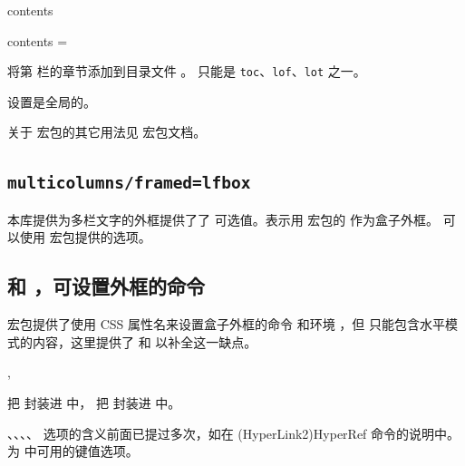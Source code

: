 \documentclass[twoside]{book}
\newcommand{\pkgdoc}[1]{\pkg{#1} 宏包文档}
\begin{document}
\begin{keyval}[path=paracol]{contents}
  \begin{syntax}
    contents =  
  \end{syntax}
  将第  栏的章节添加到目录文件 。 只能是 \texttt{toc}、\texttt{lof}、\texttt{lot} 之一。

  设置是全局的。
\end{keyval}

关于  宏包的其它用法见 \pkgdoc{paracol}。

\subsection{\texttt{multicolumns/framed=lfbox}}\label{sec:multicolumns/framed=lfbox}

本库提供为多栏文字的外框提供了了  可选值。表示用  宏包的 
 作为盒子外框。 可以使用  
宏包提供的选项。

\subsection{ 和 ，可设置外框的命令}
\label{sec:fparbox-fvarbox}

 宏包提供了使用 CSS 属性名来设置盒子外框的命令  和环境 ，但  只能包含水平模式的内容，这里提供了  和  以补全这一缺点。

\begin{function}{\fparbox,\fvarbox}
  \begin{syntax}
    \V\fparbox {} 
    \V\fparbox {}     
    \V\fvarbox {} 
    \V\fvarbox {}     
  \end{syntax}

 把  封装进  中， 把  封装进  中。

、、、、 选项的含义前面已提过多次，如在 \csref(HyperLink2){HyperRef} 命令的说明中。 为  中可用的键值选项。
\end{function}
\end{document}
